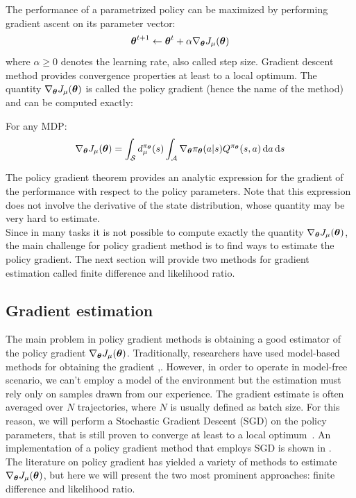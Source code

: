 The performance of a parametrized policy can be maximized by performing gradient ascent on its parameter vector:
\[
{\boldsymbol{\theta}}^{t+1} \gets {\boldsymbol{\theta}}^t + \alpha\nabla_{{\boldsymbol{\theta}}}J_\mu({\boldsymbol{\theta}})
\]
where $\alpha\geq0$ denotes the learning rate, also called step size. Gradient descent method provides convergence properties at least to a local optimum. The quantity $\nabla_{{\boldsymbol{\theta}}}J_\mu({\boldsymbol{\theta}})$ is called the policy gradient (hence the name of the method) and can be computed exactly:
\begin{theorem}
For any MDP:
\[
\nabla_{{\boldsymbol{\theta}}}J_\mu({\boldsymbol{\theta}}) = \int_{\mathcal{S}}d_\mu^{\pi_{{\boldsymbol{\theta}}}}(s)\int_{\mathcal{A}}\nabla_{{\boldsymbol{\theta}}}\pi_{{\boldsymbol{\theta}}}(a|s)Q^{\pi_{{\boldsymbol{\theta}}}}(s,a)\, \textrm{d} a \, \textrm{d} s
\]
\end{theorem}
The policy gradient theorem provides an analytic expression for the gradient of the performance with respect to the policy parameters. Note that this expression does not involve the derivative of the state distribution, whose quantity may be very hard to estimate.\\
Since in many tasks it is not possible to compute exactly the quantity $\nabla_{{\boldsymbol{\theta}}}J_\mu({\boldsymbol{\theta}})$, the main challenge for policy gradient method is to find ways to estimate the policy gradient. The next section will provide two methods for gradient estimation called finite difference and likelihood ratio.

\subsection{Gradient estimation}

\newcommand{\gradjhat}{\hat{\nabla}_{\vtheta}J_{\mu}(\vtheta)}
\newcommand{\elig}[1][\vtheta]{\nabla_{#1}\log\pi_{#1}(a|s)}

The main problem in policy gradient methods is obtaining a good estimator of the policy gradient $\nabla_{{\boldsymbol{\theta}}}J_\mu({\boldsymbol{\theta}})$. Traditionally, researchers have used model-based methods for obtaining the gradient \cite{dyer1970computation},\cite{hasdorff1976gradient}. However, in order to operate in model-free scenario, we can't employ a model of the environment but the estimation must rely only on samples drawn from our experience. The gradient estimate is often averaged over $N$ trajectories, where $N$ is usually defined as batch size. For this reason, we will perform a Stochastic Gradient Descent (SGD) on the policy parameters, that is still proven to converge at least to a local optimum~\cite{kiefer1952}. An implementation of a policy gradient method that employs SGD is shown in .\\
The literature on policy gradient has yielded a variety of methods to estimate $\nabla_{{\boldsymbol{\theta}}}J_\mu({\boldsymbol{\theta}})$, but here we will present the two most prominent approaches: finite difference and likelihood ratio.
%
